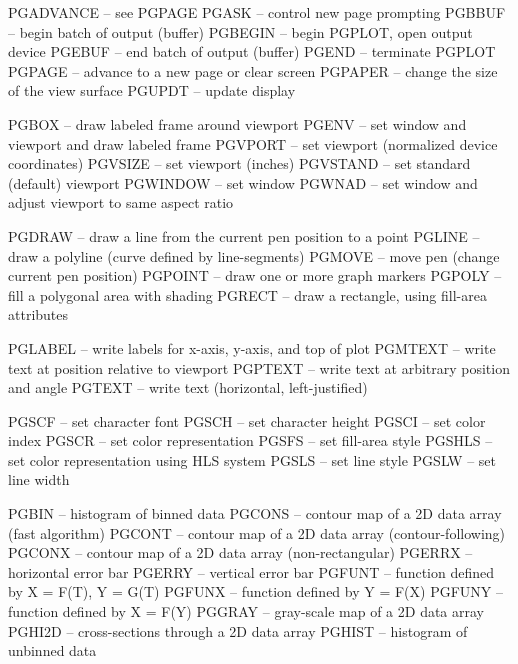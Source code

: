 {\parindent=0pt\obeylines


PGADVANCE -- see PGPAGE
PGASK -- control new page prompting
PGBBUF -- begin batch of output (buffer)
PGBEGIN -- begin PGPLOT, open output device
PGEBUF -- end batch of output (buffer)
PGEND -- terminate PGPLOT
PGPAGE -- advance to a new page or clear screen
PGPAPER -- change the size of the view surface
PGUPDT -- update display


PGBOX -- draw labeled frame around viewport
PGENV -- set window and viewport and draw labeled frame
PGVPORT -- set viewport (normalized device coordinates)
PGVSIZE -- set viewport (inches)
PGVSTAND -- set standard (default) viewport
PGWINDOW -- set window
PGWNAD -- set window and adjust viewport to same aspect ratio


PGDRAW -- draw a line from the current pen position to a point
PGLINE -- draw a polyline (curve defined by line-segments)
PGMOVE -- move pen (change current pen position)
PGPOINT -- draw one or more graph markers
PGPOLY -- fill a polygonal area with shading
PGRECT -- draw a rectangle, using fill-area attributes


PGLABEL -- write labels for x-axis, y-axis, and top of plot
PGMTEXT -- write text at position relative to viewport
PGPTEXT -- write text at arbitrary position and angle
PGTEXT -- write text (horizontal, left-justified)


PGSCF -- set character font
PGSCH -- set character height
PGSCI -- set color index
PGSCR -- set color representation
PGSFS -- set fill-area style
PGSHLS -- set color representation using HLS system
PGSLS -- set line style
PGSLW -- set line width


PGBIN -- histogram of binned data
PGCONS -- contour map of a 2D data array (fast algorithm)
PGCONT -- contour map of a 2D data array (contour-following)
PGCONX -- contour map of a 2D data array (non-rectangular)
PGERRX -- horizontal error bar
PGERRY -- vertical error bar
PGFUNT -- function defined by X = F(T), Y = G(T)
PGFUNX -- function defined by Y = F(X)
PGFUNY -- function defined by X = F(Y)
PGGRAY -- gray-scale map of a 2D data array
PGHI2D -- cross-sections through a 2D data array
PGHIST -- histogram of unbinned data

}
